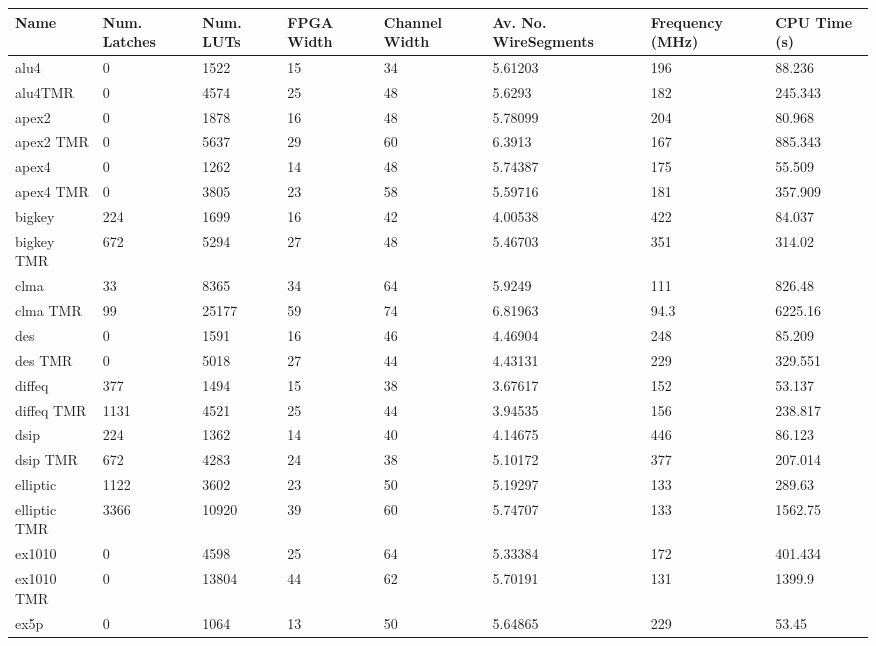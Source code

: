 \documentclass[12pt,final,oneside]{dwThesis} %
\begin{document}
\begin{table}
\footnotesize
\begin{adjustwidth}{-1cm}{-1.2cm}
    \begin{tabularx}{1.1\textwidth}{llllp{1.5cm}p{2.2cm}p{1.5cm}X}
    \toprule
Name & Num. Latches & Num. LUTs & FPGA Width & Channel Width & Av. No. Wire\newline Segments & Frequency (MHz) & CPU Time (s)\\\midrule
alu4 & 0 & 1522 & 15 & 34 & 5.61203 & 196 & 88.236\\
alu4TMR & 0 & 4574 & 25 & 48 & 5.6293 & 182 & 245.343\\\midrule
apex2 & 0 & 1878 & 16 & 48 & 5.78099 & 204 & 80.968\\
apex2 TMR & 0 & 5637 & 29 & 60 & 6.3913 & 167 & 885.343\\\midrule
apex4 & 0 & 1262 & 14 & 48 & 5.74387 & 175 & 55.509\\
apex4 TMR & 0 & 3805 & 23 & 58 & 5.59716 & 181 & 357.909\\\midrule
bigkey & 224 & 1699 & 16 & 42 & 4.00538 & 422 & 84.037\\
bigkey TMR & 672 & 5294 & 27 & 48 & 5.46703 & 351 & 314.02\\\midrule
clma & 33 & 8365 & 34 & 64 & 5.9249 & 111 & 826.48\\
clma TMR & 99 & 25177 & 59 & 74 & 6.81963 & 94.3 & 6225.16\\\midrule
des & 0 & 1591 & 16 & 46 & 4.46904 & 248 & 85.209\\
des TMR & 0 & 5018 & 27 & 44 & 4.43131 & 229 & 329.551\\\midrule
diffeq & 377 & 1494 & 15 & 38 & 3.67617 & 152 & 53.137\\
diffeq TMR & 1131 & 4521 & 25 & 44 & 3.94535 & 156 & 238.817\\\midrule
dsip & 224 & 1362 & 14 & 40 & 4.14675 & 446 & 86.123\\
dsip TMR & 672 & 4283 & 24 & 38 & 5.10172 & 377 & 207.014\\\midrule
elliptic & 1122 & 3602 & 23 & 50 & 5.19297 & 133 & 289.63\\
elliptic TMR & 3366 & 10920 & 39 & 60 & 5.74707 & 133 & 1562.75\\\midrule
ex1010 & 0 & 4598 & 25 & 64 & 5.33384 & 172 & 401.434\\
ex1010 TMR & 0 & 13804 & 44 & 62 & 5.70191 & 131 & 1399.9\\\midrule
ex5p & 0 & 1064 & 13 & 50 & 5.64865 & 229 & 53.45\\

\end{tabularx}
\end{adjustwidth}
\end{table}
\end{document}
